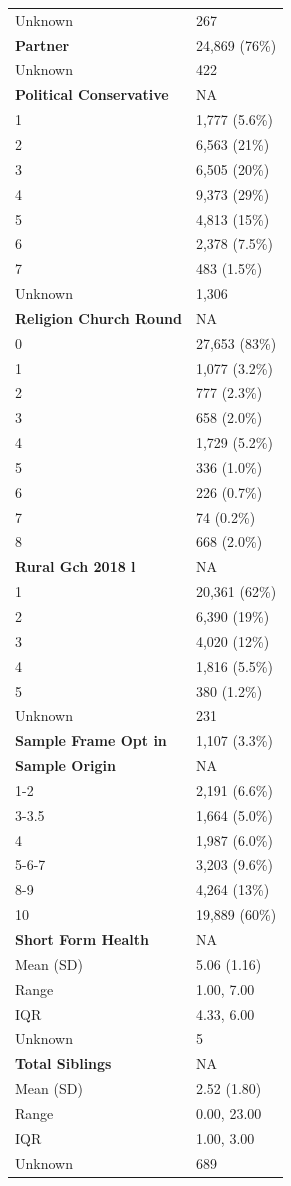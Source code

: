 \documentclass[
  single column]{article}
\begin{document}
\begin{longtable}[]{@{}ll@{}}
Unknown & 267 \\
\textbf{Partner} & 24,869 (76\%) \\
Unknown & 422 \\
\textbf{Political Conservative} & NA \\
1 & 1,777 (5.6\%) \\
2 & 6,563 (21\%) \\
3 & 6,505 (20\%) \\
4 & 9,373 (29\%) \\
5 & 4,813 (15\%) \\
6 & 2,378 (7.5\%) \\
7 & 483 (1.5\%) \\
Unknown & 1,306 \\
\textbf{Religion Church Round} & NA \\
0 & 27,653 (83\%) \\
1 & 1,077 (3.2\%) \\
2 & 777 (2.3\%) \\
3 & 658 (2.0\%) \\
4 & 1,729 (5.2\%) \\
5 & 336 (1.0\%) \\
6 & 226 (0.7\%) \\
7 & 74 (0.2\%) \\
8 & 668 (2.0\%) \\
\textbf{Rural Gch 2018 l} & NA \\
1 & 20,361 (62\%) \\
2 & 6,390 (19\%) \\
3 & 4,020 (12\%) \\
4 & 1,816 (5.5\%) \\
5 & 380 (1.2\%) \\
Unknown & 231 \\
\textbf{Sample Frame Opt in} & 1,107 (3.3\%) \\
\textbf{Sample Origin} & NA \\
1-2 & 2,191 (6.6\%) \\
3-3.5 & 1,664 (5.0\%) \\
4 & 1,987 (6.0\%) \\
5-6-7 & 3,203 (9.6\%) \\
8-9 & 4,264 (13\%) \\
10 & 19,889 (60\%) \\
\textbf{Short Form Health} & NA \\
Mean (SD) & 5.06 (1.16) \\
Range & 1.00, 7.00 \\
IQR & 4.33, 6.00 \\
Unknown & 5 \\
\textbf{Total Siblings} & NA \\
Mean (SD) & 2.52 (1.80) \\
Range & 0.00, 23.00 \\
IQR & 1.00, 3.00 \\
Unknown & 689 \\

\end{longtable}
\end{document}
